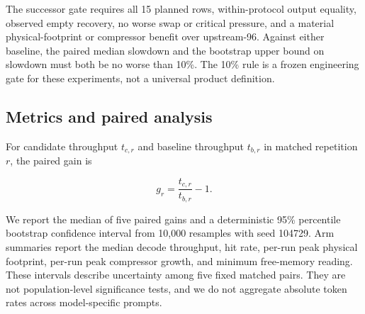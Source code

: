 The successor gate requires all 15 planned rows, within-protocol output
equality, observed empty recovery, no worse swap or critical pressure, and a
material physical-footprint or compressor benefit over upstream-96. Against
either baseline, the paired median slowdown and the bootstrap upper bound on
slowdown must both be no worse than 10\%. The 10\% rule is a frozen engineering
gate for these experiments, not a universal product definition.

\subsection{Metrics and paired analysis}

For candidate throughput $t_{c,r}$ and baseline throughput $t_{b,r}$ in matched
repetition $r$, the paired gain is

\begin{equation}
  g_r = \frac{t_{c,r}}{t_{b,r}} - 1.
  \label{eq:gain}
\end{equation}

We report the median of five paired gains and a deterministic 95\% percentile
bootstrap confidence interval from 10,000 resamples with seed 104729. Arm
summaries report the median decode throughput, hit rate, per-run peak physical footprint,
per-run peak compressor growth, and minimum free-memory reading. These
intervals describe uncertainty among five fixed matched pairs. They are not
population-level significance tests, and we do not aggregate absolute token
rates across model-specific prompts.
